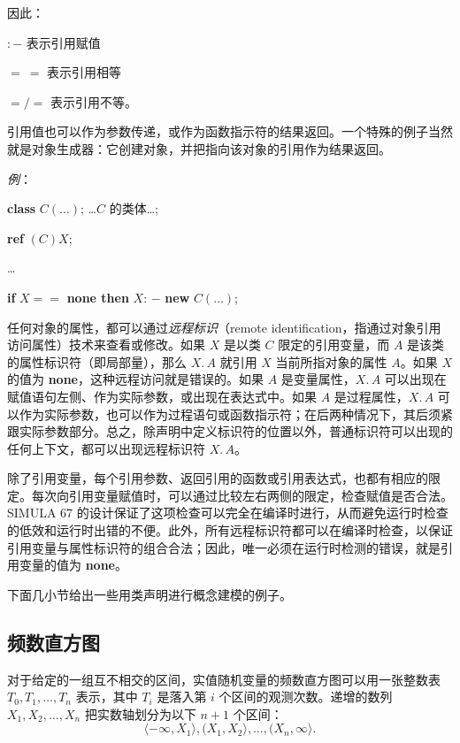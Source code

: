 \noindent
因此：

\quad $:-$\tabto*{5.6em} 表示引用赋值

\quad $=\ =$\tabto*{5.6em} 表示引用相等

\quad $=/=$\tabto*{5.6em} 表示引用不等。

\noindent
引用值也可以作为参数传递，或作为函数指示符的结果返回。一个特殊的例子当然就是对象生成器：它创建对象，并把指向该对象的引用作为结果返回。

\noindent
\textit{例}：

\quad \textbf{class} $C(\dots)$; \dots $C$ 的类体\dots;

\quad \textbf{ref} $(C)X$;

\qquad \dots

\qquad \textbf{if} $X ==$ \textbf{none then} $X$: $-$ \textbf{new} $C(\dots)$;

任何对象的属性，都可以通过\textit{远程标识}（remote identification，指通过对象引用访问属性）技术来查看或修改。如果 $X$ 是以类 $C$ 限定的引用变量，而 $A$ 是该类的属性标识符（即局部量），那么 $X.\,A$ 就引用 $X$ 当前所指对象的属性 $A$。如果 $X$ 的值为 \textbf{none}，这种远程访问就是错误的。如果 $A$ 是变量属性，$X.\,A$ 可以出现在赋值语句左侧、作为实际参数，或出现在表达式中。如果 $A$ 是过程属性，$X.\,A$ 可以作为实际参数，也可以作为过程语句或函数指示符；在后两种情况下，其后须紧跟实际参数部分。总之，除声明中定义标识符的位置以外，普通标识符可以出现的任何上下文，都可以出现远程标识符 $X.\,A$。

除了引用变量，每个引用参数、返回引用的函数或引用表达式，也都有相应的限定。每次向引用变量赋值时，可以通过比较左右两侧的限定，检查赋值是否合法。SIMULA 67 的设计保证了这项检查可以完全在编译时进行，从而避免运行时检查的低效和运行时出错的不便。此外，所有远程标识符都可以在编译时检查，以保证引用变量与属性标识符的组合合法；因此，唯一必须在运行时检测的错误，就是引用变量的值为 \textbf{none}。

下面几小节给出一些用类声明进行概念建模的例子。


\subsection{频数直方图}
\label{sec:frequency-histogram}

对于给定的一组互不相交的区间，实值随机变量的频数直方图可以用一张整数表 $T_0, T_1, \dots, T_n$ 表示，其中 $T_i$ 是落入第 $i$ 个区间的观测次数。递增的数列 $X_1, X_2, \dots, X_n$ 把实数轴划分为以下 $n + 1$ 个区间：
$$
\langle -\infty, X_1\rangle, (X_1, X_2\rangle, \dots, (X_n, \infty\rangle.
$$

